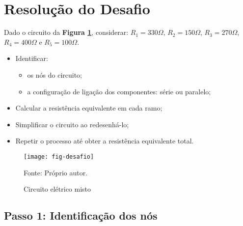 \section{Resolução do Desafio}

\begin{minipage}{\linewidth}
  \centering
  \begin{minipage}{0.45\linewidth}
    Dado o circuito da \textbf{Figura \ref{fig:resCircuitoDesafio}},
    considerar: $R_1 = 330\Omega$,
                $R_2 = 150\Omega$,
                $R_3 = 270\Omega$, \\
                $R_4 = 400\Omega$ e
                $R_5 = 100\Omega$.
    \begin{itemize}
      \item Identificar:
      \begin{itemize}
        \item os nós do circuito;
        \item a configuração de ligação dos componentes: série ou paralelo;
      \end{itemize}
      \item Calcular a resistência equivalente em cada ramo;
      \item Simplificar o circuito ao redesenhá-lo;
      \item Repetir o processo até obter a resistência equivalente total.
    \end{itemize}
  \end{minipage}
  \hspace{0.05\linewidth}
  \begin{minipage}{0.45\linewidth}
    \begin{figure}[H]
      \centering
      \caption{Circuito elétrico misto}
      \label{fig:resCircuitoDesafio}
      \texttt{[image: fig-desafio]}

      {\small Fonte: Próprio autor.}
    \end{figure}
  \end{minipage}
\end{minipage}






\subsection{Passo 1: Identificação dos nós}

